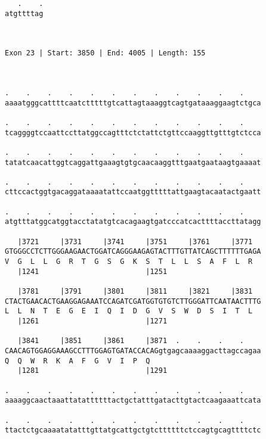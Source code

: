 \documentclass{article}
\begin{document}
\begin{Verbatim}
   .    .
atgttttag
         
         
 
Exon 23 | Start: 3850 | End: 4005 | Length: 155



.    .    .    .    .    .    .    .    .    .    .    .    
aaaatgggcattttcaatctttttgtcattagtaaaggtcagtgataaaggaagtctgca
                                                            
.    .    .    .    .    .    .    .    .    .    .    .    
tcaggggtccaattccttatggccagtttctctattctgttccaaggttgtttgtctcca
                                                            
.    .    .    .    .    .    .    .    .    .    .    .    
tatatcaacattggtcaggattgaaagtgtgcaacaaggtttgaatgaataagtgaaaat
                                                            
.    .    .    .    .    .    .    .    .    .    .    .    
cttccactggtgacaggataaaatattccaatggtttttattgaagtacaatactgaatt
                                                            
.    .    .    .    .    .    .    .    .    .    .    .    
atgtttatggcatggtacctatatgtcacagaagtgatcccatcacttttaccttatagg
                                                            
   |3721     |3731     |3741     |3751     |3761     |3771  
GTGGGCCTCTTGGGAAGAACTGGATCAGGGAAGAGTACTTTGTTATCAGCTTTTTTGAGA
V  G  L  L  G  R  T  G  S  G  K  S  T  L  L  S  A  F  L  R  
   |1241                         |1251                      
  
   |3781     |3791     |3801     |3811     |3821     |3831  
CTACTGAACACTGAAGGAGAAATCCAGATCGATGGTGTGTCTTGGGATTCAATAACTTTG
L  L  N  T  E  G  E  I  Q  I  D  G  V  S  W  D  S  I  T  L  
   |1261                         |1271                      
  
   |3841     |3851     |3861     |3871  .    .    .    .    
CAACAGTGGAGGAAAGCCTTTGGAGTGATACCACAGgtgagcaaaaggacttagccagaa
Q  Q  W  R  K  A  F  G  V  I  P  Q                          
   |1281                         |1291                      
  
.    .    .    .    .    .    .    .    .    .    .    .    
aaaaggcaactaaattatattttttactgctatttgatacttgtactcaagaaattcata
                                                            
.    .    .    .    .    .    .    .    .    .    .    .    
ttactctgcaaaatatatttgttatgcattgctgtcttttttctccagtgcagttttctc
                                                            

\end{Verbatim}
\end{document}
